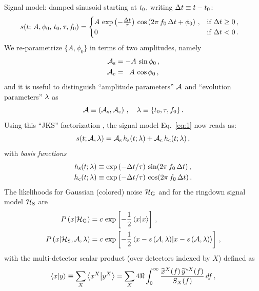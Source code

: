 \documentclass[aps,prd,onecolumn,notitlepage,nofootinbib,superscriptaddress,altaffilletter,floatfix]{revtex4-1}
\begin{document}
Signal model: damped sinusoid starting at $t_0$, writing $\Delta t \equiv t - t_0$:
\begin{align}
  \label{eq:1}
  s(t;\, A,\phi_0,\,t_0,\tau,f_0) &=
  \begin{cases}
    A\,\exp\left(-\frac{\Delta t}{\tau}\right)\,\cos\left(2\pi\,f_0\,\Delta t + \phi_0\right)\,, & \text{if } \Delta t \ge 0\,,\\
    0  & \text{if } \Delta t < 0\,.
  \end{cases}
\end{align}
We re-parametrize $\{A,\phi_0\}$ in terms of two amplitudes, namely
\begin{align}
  \label{eq:47}
  {\mathcal A}_{\mathrm{s}} &= -A\,\sin\phi_0\,,\\
  {\mathcal A}_{\mathrm{c}} &= \;\;A\,\cos\phi_0\,,
\end{align}
and it is useful to distinguish ``amplitude parameters'' ${\mathcal A}$ and ``evolution parameters'' $\lambda$ as
\begin{equation}
  \label{eq:11}
  {\mathcal A} \equiv \left({\mathcal A}_{\mathrm{s}},{\mathcal A}_{\mathrm{c}}\right)\,,
  \quad \lambda \equiv \{t_0,\tau, f_0\}\,.
\end{equation}
Using this ``JKS'' factorization \cite{bretthorst1988:_bayesian_spectrum,jks98:_data}, the signal model Eq.~\eqref{eq:1} now reads as:
\begin{equation}
  \label{eq:2}
  s(t; {\mathcal A},\lambda) = {\mathcal A}_{\mathrm{s}} \, h_\mathrm{s}(t;\lambda) + {\mathcal A}_{\mathrm{c}}\,h_\mathrm{c}(t;\lambda)\,,
\end{equation}
with \emph{basis functions}
\begin{align}
  \label{eq:14}
  h_\mathrm{s}(t;\lambda) &\equiv \exp\left(-\Delta t/\tau\right)\,\sin(2\pi \,f_0\,\Delta t)\,,\\
  h_\mathrm{c}(t;\lambda) &\equiv \exp\left(-\Delta t/\tau\right)\,\cos(2\pi \,f_0\,\Delta t)\,.
\end{align}
The likelihoods for Gaussian (colored) noise $\mathcal{H}_{\mathrm{G}}$ and for the ringdown signal model $\mathcal{H}_{\mathrm{S}}$ are
\begin{align}
  P\left(x\middle|\mathcal{H}_{\mathrm{G}}\right) &= c\,\exp\left[-\frac{1}{2}\left\langle x\middle|x\right\rangle\right]\,,   \label{eq:4a}\\
  P\left(x\middle|\mathcal{H}_{\mathrm{S}},{\mathcal A},\lambda\right) &= c\,\exp\left[-\frac{1}{2}\left\langle x-s\left({\mathcal A},\lambda\right)\middle|x-s\left({\mathcal A},\lambda\right)\right\rangle\right]\,,  \label{eq:4b}
\end{align}
with the multi-detector scalar product (over detectors indexed by $X$) defined as
\begin{equation}
  \label{eq:5}
  \left\langle x\middle|y\right\rangle\equiv \sum_{X} \left\langle x^X\middle|y^X\right\rangle = \sum_X 4\Re\int_{0}^{\infty} \frac{\widetilde{x}^X(f)\,\widetilde{y}^{*X}(f)}{S_X(f)}\,df\,,
\end{equation}
\end{document}
